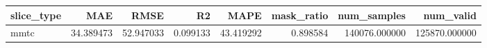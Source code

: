 \begin{tabular}{lrrrrrrr}
\toprule
slice_type & MAE & RMSE & R2 & MAPE & mask_ratio & num_samples & num_valid \\
\midrule
mmtc & 34.389473 & 52.947033 & 0.099133 & 43.419292 & 0.898584 & 140076.000000 & 125870.000000 \\
\bottomrule
\end{tabular}
